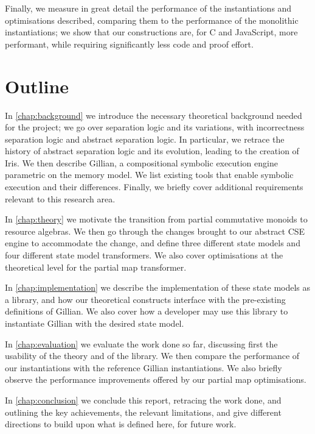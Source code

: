 Finally, we measure in great detail the performance of the instantiations and optimisations described, comparing them to the performance of the monolithic instantiations; we show that our constructions are, for C and JavaScript, more performant, while requiring significantly less code and proof effort.

\section{Outline}

In \autoref{chap:background} we introduce the necessary theoretical background needed for the project; we go over separation logic and its variations, with incorrectness separation logic and abstract separation logic. In particular, we retrace the history of abstract separation logic and its evolution, leading to the creation of Iris. We then describe Gillian, a compositional symbolic execution engine parametric on the memory model. We list existing tools that enable symbolic execution and their differences. Finally, we briefly cover additional requirements relevant to this research area.

In \autoref{chap:theory} we motivate the transition from partial commutative monoids to resource algebras. We then go through the changes brought to our abstract CSE engine to accommodate the change, and define three different state models and four different state model transformers. We also cover optimisations at the theoretical level for the partial map transformer.

In \autoref{chap:implementation} we describe the implementation of these state models as a library, and how our theoretical constructs interface with the pre-existing definitions of Gillian. We also cover how a developer may use this library to instantiate Gillian with the desired state model.

In \autoref{chap:evaluation} we evaluate the work done so far, discussing first the usability of the theory and of the library. We then compare the performance of our instantiations with the reference Gillian instantiations. We also briefly observe the performance improvements offered by our partial map optimisations.

In \autoref{chap:conclusion} we conclude this report, retracing the work done, and outlining the key achievements, the relevant limitations, and give different directions to build upon what is defined here, for future work.

